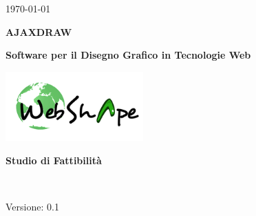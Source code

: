 
\title{\TITOLODOC}
\author{Piero Bizzotto}



\renewcommand{\insertversion}{0.1} %
\renewcommand{\TITOLODOC}{Studio di Fattibilit\`{a}} %
\renewcommand{\glosspath}{.\glossario} %

\begin{titlepage}
\begin{center}
	\begin{Large}	\today \end{Large}
\end{center}

\vspace{20pt}

\begin{center}
	\begin{Huge}
				\textbf{AJAXDRAW}
	\end{Huge}
\end{center}			

\begin{center}
	\begin{large}
				\textbf{Software per il Disegno Grafico in Tecnologie Web}
	\end{large}
\end{center}			

\vspace{20pt}

\begin{center}
\includegraphics[width=150pt]{../logo/logo}
\end{center}

\vspace{170pt}
\begin{center} %
	\begin{Huge}
				\textbf{\TITOLODOC}
	\end{Huge}
			\\
\end{center}
\vspace{210pt}
\begin{center}
Versione: \insertversion
\end{center}
\end{titlepage}

